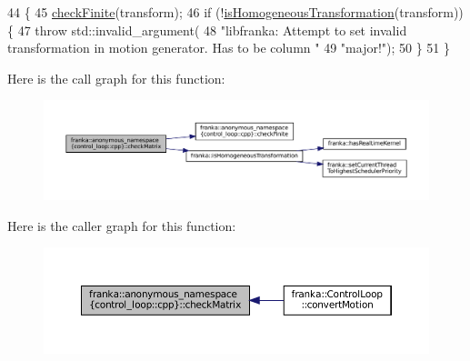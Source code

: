 \begin{DoxyCode}
44                                                                \{
45   \hyperlink{namespacefranka_1_1anonymous__namespace_02control__loop_8cpp_03_af284e9c97573a00e6fc31f0c716d6add}{checkFinite}(transform);
46   \textcolor{keywordflow}{if} (!\hyperlink{namespacefranka_ad81c99e8af3f2536ae3c6ec1ce8dce1e}{isHomogeneousTransformation}(transform)) \{
47     \textcolor{keywordflow}{throw} std::invalid\_argument(
48         \textcolor{stringliteral}{"libfranka: Attempt to set invalid transformation in motion generator. Has to be column "}
49         \textcolor{stringliteral}{"major!"});
50   \}
51 \}
\end{DoxyCode}
Here is the call graph for this function\+:
\nopagebreak
\begin{figure}[H]
\begin{center}
\leavevmode
\includegraphics[width=350pt]{namespacefranka_1_1anonymous__namespace_02control__loop_8cpp_03_aff0fa7aeeb1c7339b142b323b30b1146_cgraph}
\end{center}
\end{figure}
Here is the caller graph for this function\+:
\nopagebreak
\begin{figure}[H]
\begin{center}
\leavevmode
\includegraphics[width=350pt]{namespacefranka_1_1anonymous__namespace_02control__loop_8cpp_03_aff0fa7aeeb1c7339b142b323b30b1146_icgraph}
\end{center}
\end{figure}
